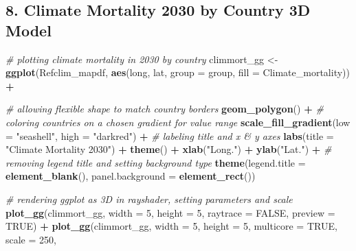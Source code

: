 \documentclass[
]{article}
\newenvironment{Shaded}{\begin{snugshade}}{\end{snugshade}}
\newcommand{\CommentTok}[1]{\textcolor[rgb]{0.56,0.35,0.01}{\textit{#1}}}
\newcommand{\DataTypeTok}[1]{\textcolor[rgb]{0.13,0.29,0.53}{#1}}
\newcommand{\DecValTok}[1]{\textcolor[rgb]{0.00,0.00,0.81}{#1}}
\newcommand{\KeywordTok}[1]{\textcolor[rgb]{0.13,0.29,0.53}{\textbf{#1}}}
\newcommand{\NormalTok}[1]{#1}
\newcommand{\OperatorTok}[1]{\textcolor[rgb]{0.81,0.36,0.00}{\textbf{#1}}}
\newcommand{\OtherTok}[1]{\textcolor[rgb]{0.56,0.35,0.01}{#1}}
\newcommand{\StringTok}[1]{\textcolor[rgb]{0.31,0.60,0.02}{#1}}
\begin{document}
\newpage

\hypertarget{climate-mortality-2030-by-country-3d-model}{%
\subsection{8. Climate Mortality 2030 by Country 3D
Model}\label{climate-mortality-2030-by-country-3d-model}}

\begin{Shaded}
\begin{Highlighting}[]
\CommentTok{# plotting climate mortality in 2030 by country }
\NormalTok{climmort_gg <-}\StringTok{ }\KeywordTok{ggplot}\NormalTok{(Refclim_mapdf, }\KeywordTok{aes}\NormalTok{(long, lat, }\DataTypeTok{group =}\NormalTok{ group, }\DataTypeTok{fill =}\NormalTok{ Climate_mortality)) }\OperatorTok{+}\StringTok{ }

\CommentTok{# allowing flexible shape to match country borders}
\StringTok{  }\KeywordTok{geom_polygon}\NormalTok{() }\OperatorTok{+}\StringTok{ }
\StringTok{  }
\CommentTok{# coloring countries on a chosen gradient for value range}
\StringTok{  }\KeywordTok{scale_fill_gradient}\NormalTok{(}\DataTypeTok{low =} \StringTok{"seashell"}\NormalTok{, }\DataTypeTok{high =} \StringTok{"darkred"}\NormalTok{) }\OperatorTok{+}\StringTok{ }
\StringTok{  }
\CommentTok{# labeling title and x & y axes}
\StringTok{  }\KeywordTok{labs}\NormalTok{(}\DataTypeTok{title =} \StringTok{"Climate Mortality 2030"}\NormalTok{) }\OperatorTok{+}\StringTok{ }
\StringTok{  }\KeywordTok{theme}\NormalTok{() }\OperatorTok{+}\StringTok{ }
\StringTok{  }\KeywordTok{xlab}\NormalTok{(}\StringTok{"Long."}\NormalTok{) }\OperatorTok{+}\StringTok{ }
\StringTok{  }\KeywordTok{ylab}\NormalTok{(}\StringTok{"Lat."}\NormalTok{) }\OperatorTok{+}\StringTok{ }
\StringTok{ }
\CommentTok{# removing legend title and setting background type}
\StringTok{  }\KeywordTok{theme}\NormalTok{(}\DataTypeTok{legend.title =} \KeywordTok{element_blank}\NormalTok{(), }
         \DataTypeTok{panel.background =} \KeywordTok{element_rect}\NormalTok{())}


\CommentTok{# rendering ggplot as 3D in rayshader, setting parameters and scale}
\KeywordTok{plot_gg}\NormalTok{(climmort_gg, }\DataTypeTok{width =} \DecValTok{5}\NormalTok{, }\DataTypeTok{height =} \DecValTok{5}\NormalTok{, }\DataTypeTok{raytrace =} \OtherTok{FALSE}\NormalTok{, }\DataTypeTok{preview =} \OtherTok{TRUE}\NormalTok{) }\OperatorTok{+}\StringTok{ }
\StringTok{  }\KeywordTok{plot_gg}\NormalTok{(climmort_gg, }\DataTypeTok{width =} \DecValTok{5}\NormalTok{, }\DataTypeTok{height =} \DecValTok{5}\NormalTok{, }\DataTypeTok{multicore =} \OtherTok{TRUE}\NormalTok{, }\DataTypeTok{scale =} \DecValTok{250}\NormalTok{, }
                                                                                       

\end{Highlighting}
\end{Shaded}
\end{document}

